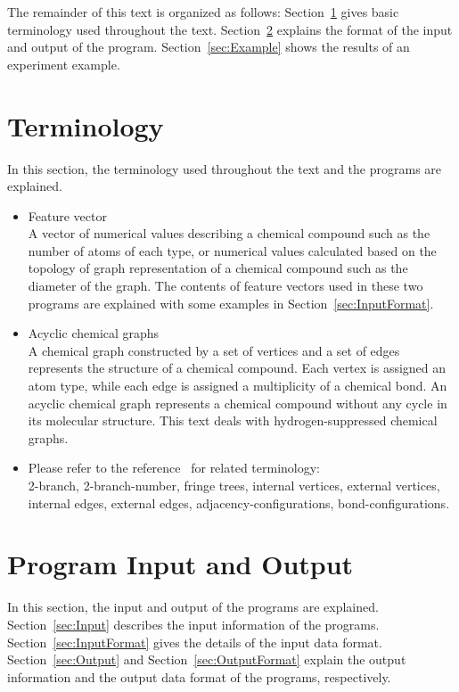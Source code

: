 \documentclass[11pt,titlepage,dvipdfmx,twoside]{article}
\begin{document}
The remainder of this text is organized as follows:
Section~\ref{sec:term} gives basic terminology used throughout the text.
Section~\ref{sec:InOut} explains the format of the input and output of the program.
Section~\ref{sec:Example} shows the results of an experiment example.


\newpage

\section{Terminology}
\label{sec:term}

In this section, the terminology used throughout the text and the programs are explained.

\begin{itemize}
\item Feature vector\\
A vector of numerical values describing a chemical compound
such as the number of atoms of each type,
or numerical values calculated based on the topology of graph representation of a chemical compound 
such as the diameter of the graph.
The contents of feature vectors used in these two programs 
are explained with some examples in Section~\ref{sec:InputFormat}.

\item Acyclic chemical graphs\\
A chemical graph constructed by a set of vertices and a set of edges
represents the structure of a chemical compound.
Each vertex is assigned an atom type, while each edge is assigned 
a multiplicity of a chemical bond.
An acyclic chemical graph represents a chemical compound without any cycle in its molecular structure.
This text deals with hydrogen-suppressed chemical graphs.

\item Please refer to the reference~\cite{branch} for related terminology: \\
2-branch, 2-branch-number, fringe trees, internal vertices, external vertices, 
internal edges, external edges, adjacency-configurations, bond-configurations.

\end{itemize}

\section{Program Input and Output}
\label{sec:InOut}

In this section, the input and output of the programs are explained.
Section~\ref{sec:Input} describes the input information of the programs.
Section~\ref{sec:InputFormat} gives the details of the input data format.
Section~\ref{sec:Output} and Section~\ref{sec:OutputFormat} explain 
the output information and the output data format of the programs, respectively.
\end{document}

